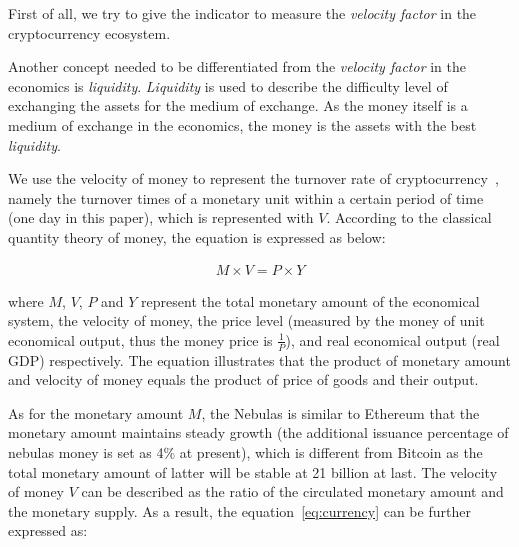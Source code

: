 First of all, we try to give the indicator to measure the \emph{velocity factor} in the cryptocurrency ecosystem. 

Another concept needed to be differentiated from the \emph{velocity factor} in the economics is \emph{liquidity}. \emph{Liquidity} is used to describe the difficulty level of exchanging the assets for the medium of exchange. As the money itself is a medium of exchange in the economics, the money is the assets with the best \emph{liquidity}.


We use the velocity of money to represent the turnover rate of cryptocurrency~\cite{selden}, namely the turnover times of a monetary unit within a certain period of time (one day in this paper), which is represented with $V$. According to the classical quantity theory of money, the equation is expressed as below:

\begin{align}
M\times V=P\times Y
\label{eq:currency}
\end{align}

\noindent where $M$, $V$, $P$ and $Y$ represent the total monetary amount of the economical system, the velocity of money, the price level (measured by the money of unit economical output, thus the money price is $\frac{1}{P}$), and real economical output (real GDP) respectively. The equation illustrates that the product of monetary amount and velocity of money equals the product of price of goods and their output.

As for the monetary amount $M$, the Nebulas is similar to Ethereum that the monetary amount maintains steady growth (the additional issuance percentage of nebulas money is set as 4\% at present), which is different from Bitcoin as the total monetary amount of latter will be stable at 21 billion at last. The velocity of money $V$ can be described as the ratio of the circulated monetary amount and the monetary supply. As a result, the equation~\ref{eq:currency} can be further expressed as:


